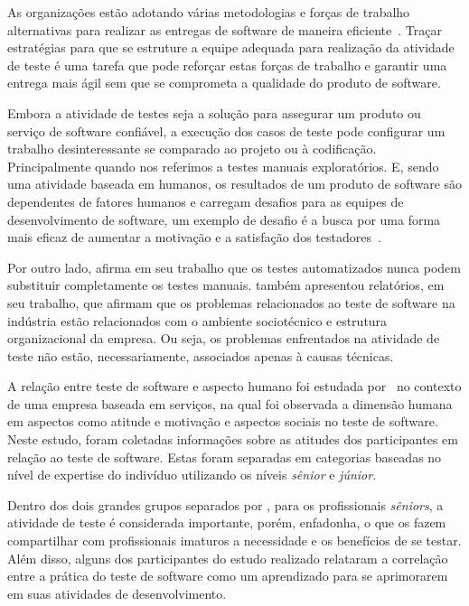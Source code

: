 As organizações estão adotando várias metodologias e forças de trabalho alternativas para realizar as entregas de software de maneira eficiente~\cite{dubey2017personas}. Traçar estratégias para que se estruture a equipe adequada para realização da atividade de teste é uma tarefa que pode reforçar estas forças de trabalho e garantir uma entrega mais ágil sem que se comprometa a qualidade do produto de software.

Embora a atividade de testes seja a solução para assegurar um produto ou serviço de software confiável, a execução dos casos de teste pode configurar um trabalho desinteressante se comparado ao projeto ou à codificação. Principalmente quando nos referimos a testes manuais exploratórios. E, sendo uma atividade baseada em humanos, os resultados de um produto de software são dependentes de fatores humanos e carregam desafios para as equipes de desenvolvimento de software, um exemplo de desafio é a busca por uma forma mais eficaz de aumentar a motivação e a satisfação dos testadores~\cite{deak2016challenges}.

Por outro lado, \cite{berner2005observations} afirma em seu trabalho que os testes automatizados nunca podem substituir completamente os testes manuais. \cite{martin2007good} também apresentou relatórios, em seu trabalho, que afirmam que os problemas relacionados ao teste de software na indústria estão relacionados com o ambiente sociotécnico e estrutura organizacional da empresa. Ou seja, os problemas enfrentados na atividade de teste não estão, necessariamente, associados apenas à causas técnicas.

A relação entre teste de software e aspecto humano foi estudada por~\cite{shah2010studying} no contexto de uma empresa baseada em serviços, na qual foi observada a dimensão humana em aspectos como atitude e motivação e aspectos sociais no teste de software. Neste estudo, foram coletadas informações sobre as atitudes dos participantes em relação ao teste de software. Estas foram separadas em categorias baseadas no nível de expertise do indivíduo utilizando os níveis \textit{sênior} e \textit{júnior}. 

 
Dentro dos dois grandes grupos separados por \cite{shah2010studying}, para os profissionais \textit{sêniors}, a atividade de teste é considerada importante, porém, enfadonha, o que os fazem compartilhar com profissionais imaturos a necessidade e os benefícios de se testar. Além disso, alguns dos participantes do estudo realizado relataram a correlação entre a prática do teste de software como um aprendizado para se aprimorarem em suas atividades de desenvolvimento.

